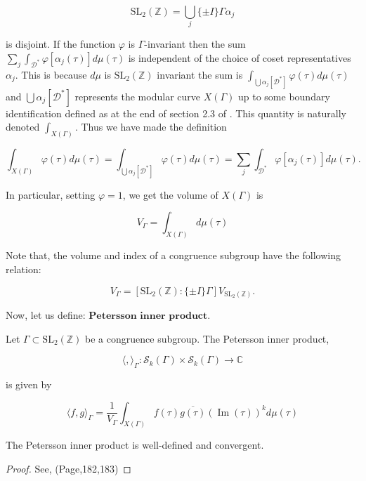 $$
\mathrm{SL}_{2}(\mathbb{Z})=\bigcup_{j}\{ \pm I\} \Gamma \alpha_{j}
$$

is disjoint. If the function $\varphi$ is $\Gamma$-invariant then the sum $\sum_{j} \int_{\mathcal{D}^{*}} \varphi\left[\alpha_{j}(\tau)\right] d \mu(\tau)$ is independent of the choice of coset representatives $\alpha_{j}$. This is because $d \mu$ is $\mathrm{SL}_{2}(\mathbb{Z})$ invariant the sum is $\int_{\bigcup \alpha_{j}\left[\mathcal{D}^{*}\right]} \varphi(\tau) d \mu(\tau)$ and  $\bigcup \alpha_{j}\left[\mathcal{D}^{*}\right]$ represents the modular curve $X(\Gamma)$ up to some boundary identification defined as at the end of section 2.3 of \cite{diamond2005first}.
This quantity is naturally denoted $\int_{X(\Gamma)}$. Thus we have made the definition

$$
\int_{X(\Gamma)} \varphi(\tau) d \mu(\tau)=\int_{\bigcup \alpha_{j}\left[\mathcal{D}^{*}\right]} \varphi(\tau) d \mu(\tau)=\sum_{j} \int_{\mathcal{D}^{*}} \varphi\left[\alpha_{j}(\tau)\right] d \mu(\tau) .
$$

In particular, setting $\varphi=1$, we get the volume of $X(\Gamma)$ is

$$
V_{\Gamma}=\int_{X(\Gamma)} d \mu(\tau)
$$

Note that, the volume and index of a congruence subgroup have the following relation: 

$$
V_{\Gamma}=\left[\mathrm{SL}_{2}(\mathbb{Z}):\{ \pm I\} \Gamma\right] V_{\mathrm{SL}_{2}(\mathbb{Z})} .
$$

Now, let us define: $\textbf{Petersson inner product}.$

\begin{definition}
    Let $\Gamma \subset \mathrm{SL}_{2}(\mathbb{Z})$ be a congruence subgroup. The Petersson inner product,

$$
\langle,\rangle_{\Gamma}: \mathcal{S}_{k}(\Gamma) \times \mathcal{S}_{k}(\Gamma) \longrightarrow \mathbb{C}
$$

is given by

$$
\langle f, g\rangle_{\Gamma}=\frac{1}{V_{\Gamma}} \int_{X(\Gamma)} f(\tau) \overline{g(\tau)}(\operatorname{Im}(\tau))^{k} d \mu(\tau)
$$
\end{definition}

\begin{proposition}
    The Petersson inner product is well-defined and convergent.
    \begin{proof}
        See, (\cite{diamond2005first}Page,182,183)
    \end{proof}
\end{proposition}

